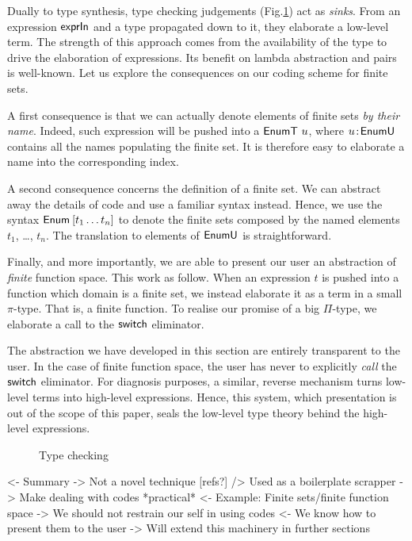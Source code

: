 Dually to type synthesis, type checking judgements
(Fig.\ref{fig:type-checking}) act as \emph{sinks}. From an expression
$\textsf{exprIn}$ and a type propagated down to it, they elaborate a low-level
term. The strength of this approach comes from the availability of the
type to drive the elaboration of expressions. Its benefit on lambda
abstraction and pairs is well-known. Let us explore the consequences
on our coding scheme for finite sets.

A first consequence is that we can actually denote elements of finite
sets \emph{by their name}. Indeed, such expression will be pushed into
a $\EnumT{u}$, where $\Bhab{u}{\EnumU}$ contains all the names
populating the finite set. It is therefore easy to elaborate a name
into the corresponding index.

A second consequence concerns the definition of a finite set. We can
abstract away the details of code and use a familiar syntax
instead. Hence, we use the syntax $\Enum\: [t_1 \ldots t_n]$ to denote
the finite sets composed by the named elements $t_1$, \ldots,
$t_n$. The translation to elements of $\EnumU$ is straightforward.


Finally, and more importantly, we are able to present our user an
abstraction of \emph{finite} function space. This work as follow. When
an expression $t$ is pushed into a function which domain is a finite
set, we instead elaborate it as a term in a small $\pi$-type. That is,
a finite function. To realise our promise of a big $\Pi$-type, we
elaborate a call to the $\F{switch}$ eliminator. 

The abstraction we have developed in this section are entirely
transparent to the user. In the case of finite function space, the
user has never to explicitly \emph{call} the $\F{switch}$
eliminator. For diagnosis purposes, a similar, reverse mechanism turns
low-level terms into high-level expressions. Hence, this system, which
presentation is out of the scope of this paper, seals the low-level
type theory behind the high-level expressions.

\begin{figure}

\caption{Type checking}
\label{fig:type-checking}
\end{figure}

\begin{wstructure}
<- Summary
    -> Not a novel technique [refs?]
        /> Used as a boilerplate scrapper
    -> Make dealing with codes *practical*
        <- Example: Finite sets/finite function space
        -> We should not restrain our self in using codes
            <- We know how to present them to the user
-> Will extend this machinery in further sections
\end{wstructure}

